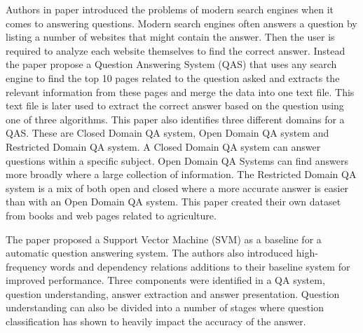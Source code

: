 Authors in paper \cite{RestrictedDomain} introduced the problems of modern search engines when it comes to answering questions. Modern search engines often answers a question by listing a number of websites that might contain the answer. Then the user is required to analyze each website themselves to find the correct answer. Instead the paper propose a Question Answering System (QAS) that uses any search engine to find the top 10 pages related to the question asked and extracts the relevant information from these pages and merge the data into one text file. This text file is later used to extract the correct answer based on the question using one of three algorithms. This paper also identifies three different domains for a QAS. These are Closed Domain QA system, Open Domain QA system and Restricted Domain QA system. A Closed Domain QA system can answer questions within a specific subject. Open Domain QA Systems can find answers more broadly where a large collection of information.  The Restricted Domain QA system is a mix of both open and closed where a more accurate answer is easier than with an Open Domain QA system. This paper created their own dataset from books and web pages related to agriculture. 

The paper \cite{AutomaticQA} proposed a Support Vector Machine (SVM) as a baseline for a automatic question answering system. The authors also introduced high-frequency words and dependency relations additions to their baseline system for improved performance. Three components were identified in a QA system, question understanding, answer extraction and answer presentation.  Question understanding can also be divided into a number of stages where question classification has shown to heavily impact the accuracy of the answer. 

